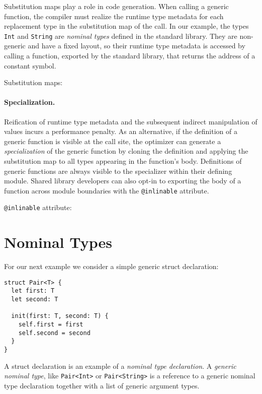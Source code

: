 \documentclass[../generics]{subfiles}
\begin{document}
Substitution maps play a role in code generation. When calling a generic function, the compiler must realize the runtime type metadata for each replacement type in the substitution map of the call. In our example, the types \texttt{Int} and \texttt{String} are \emph{nominal types} defined in the standard library. They are non-generic and have a fixed layout, so their runtime type metadata is accessed by calling a function, exported by the standard library, that returns the address of a constant symbol.

\begin{MoreDetails}
\item Substitution maps: 
\end{MoreDetails}

\paragraph{Specialization.} Reification of runtime type metadata and the subsequent indirect manipulation of values incurs a performance penalty. As an alternative, if the definition of a generic function is visible at the call site, the optimizer can generate a \emph{specialization} of the generic function by cloning the definition and applying the substitution map to all types appearing in the function's body. Definitions of generic functions are always visible to the specializer within their defining module. Shared library developers can also opt-in to exporting the body of a function across module boundaries with the \texttt{@inlinable} attribute.

\begin{MoreDetails}
\item \texttt{@inlinable} attribute: 
\end{MoreDetails}

\section{Nominal Types}

For our next example we consider a simple generic struct declaration:
\begin{Verbatim}
struct Pair<T> {
  let first: T
  let second: T

  init(first: T, second: T) {
    self.first = first
    self.second = second
  }
}
\end{Verbatim}
A struct declaration is an example of a \emph{nominal type declaration}. A \emph{generic nominal type}, like \texttt{Pair<Int>} or \texttt{Pair<String>} is a reference to a generic nominal type declaration together with a list of generic argument types.
\end{document}
